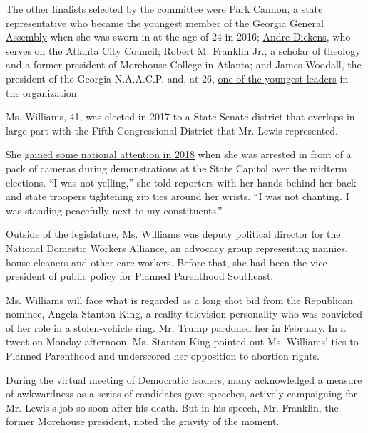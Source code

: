 The other finalists selected by the committee were Park Cannon, a state
representative
\href{https://www.cnn.com/2016/03/29/us/park-cannon-georgia-house-feat/index.html}{who
became the youngest member of the Georgia General Assembly} when she was
sworn in at the age of 24 in 2016;
\href{https://saportareport.com/a-conversation-with-atlanta-city-councilman-andre-dickens/}{Andre
Dickens}, who serves on the Atlanta City Council;
\href{https://www.morehouse.edu/about/presidentsbio.html}{Robert M.
Franklin Jr.}, a scholar of theology and a former president of Morehouse
College in Atlanta; and James Woodall, the president of the Georgia
N.A.A.C.P. and, at 26,
\href{https://www.thecrisismagazine.com/single-post/2019/12/09/James-Woodall-Makes-History-as-Youngest-NAACP-State-Conference-President}{one
of the youngest leaders} in the organization.

Ms. Williams, 41, was elected in 2017 to a State Senate district that
overlaps in large part with the Fifth Congressional District that Mr.
Lewis represented.

She
\href{https://www.motherjones.com/politics/2018/11/georgia-state-senator-nikema-williams-arrest-1/}{gained
some national attention in 2018} when she was arrested in front of a
pack of cameras during demonstrations at the State Capitol over the
midterm elections. ``I was not yelling,'' she told reporters with her
hands behind her back and state troopers tightening zip ties around her
wrists. ``I was not chanting. I was standing peacefully next to my
constituents.''

Outside of the legislature, Ms. Williams was deputy political director
for the National Domestic Workers Alliance, an advocacy group
representing nannies, house cleaners and other care workers. Before
that, she had been the vice president of public policy for Planned
Parenthood Southeast.

Ms. Williams will face what is regarded as a long shot bid from the
Republican nominee, Angela Stanton-King, a reality-television
personality who was convicted of her role in a stolen-vehicle ring. Mr.
Trump pardoned her in February. In a tweet on Monday afternoon, Ms.
Stanton-King pointed out Ms. Williams' ties to Planned Parenthood and
underscored her opposition to abortion rights.

During the virtual meeting of Democratic leaders, many acknowledged a
measure of awkwardness as a series of candidates gave speeches, actively
campaigning for Mr. Lewis's job so soon after his death. But in his
speech, Mr. Franklin, the former Morehouse president, noted the gravity
of the moment.

